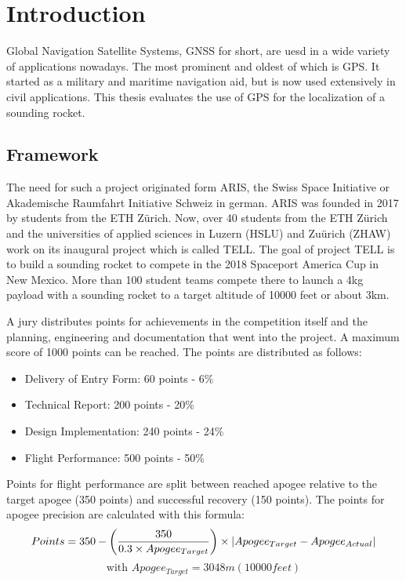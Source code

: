 \chapter{Introduction}

Global Navigation Satellite Systems, GNSS for short, are uesd in a wide variety of applications nowadays.
The most prominent and oldest of which is GPS.
It started as a military and maritime navigation aid, but is now used extensively in civil applications.
This thesis evaluates the use of GPS for the localization of a sounding rocket.

\section{Framework}

The need for such a project originated form ARIS, the Swiss Space Initiative or Akademische Raumfahrt Initiative Schweiz in german.
ARIS was founded in 2017 by students from the ETH Z\"urich.
Now, over 40 students from the ETH Z\"urich and the universities of applied sciences in Luzern (HSLU) and Zu\"urich (ZHAW) work on its inaugural project which is called TELL.
The goal of project TELL is to build a sounding rocket to compete in the 2018 Spaceport America Cup in New Mexico.
More than 100 student teams compete there to launch a 4kg payload with a sounding rocket to a target altitude of 10000 feet or about 3km. \cite{aris}

A jury distributes points for achievements in the competition itself and the planning, engineering and documentation that went into the project.
A maximum score of 1000 points can be reached.
The points are distributed as follows:
\begin{itemize}
 \item Delivery of Entry Form: 60 points - 6\%
 \item Technical Report: 200 points - 20\%
 \item Design Implementation: 240 points - 24\%
 \item Flight Performance: 500 points - 50\%
\end{itemize}

Points for flight performance are split between reached apogee relative to the target apogee (350 points) and successful recovery (150 points).
The points for apogee precision are calculated with this formula:
$$ Points = 350 - \left( \frac{350}{0.3 \times Apogee_{Target}} \right) \times \abs{Apogee_{Target} - Apogee_{Actual}} $$
$$ \text{with } Apogee_{Target} = 3048m(10000feet)$$ 

